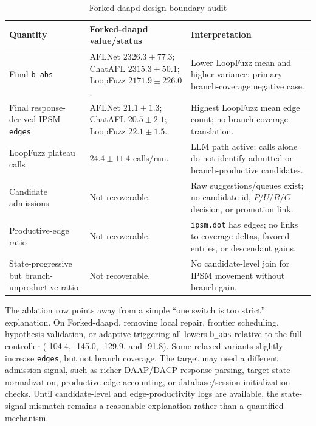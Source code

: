 \documentclass[final,5p,times,number]{elsarticle}
\begin{document}
\begin{table}[!t]
\centering
\caption{Forked-daapd design-boundary audit}
\label{tab:forked_design_boundary}
{\scriptsize
\setlength{\tabcolsep}{3.2pt}
\renewcommand{\arraystretch}{0.95}
\begin{tabularx}{\textwidth}{>{\raggedright\arraybackslash}p{}
                              >{\raggedright\arraybackslash}p{}
                              X}
\toprule
\textbf{Quantity} & \textbf{Forked-daapd value/status} & \textbf{Interpretation} \\
\midrule
Final \texttt{b\_abs} &
AFLNet $2326.3{\pm}77.3$; ChatAFL $2315.3{\pm}50.1$; LoopFuzz $2171.9{\pm}226.0$. &
Lower LoopFuzz mean and higher variance; primary branch-coverage negative case. \\
\midrule
Final response-derived IPSM \texttt{edges} &
AFLNet $21.1{\pm}1.3$; ChatAFL $20.5{\pm}2.1$; LoopFuzz $22.1{\pm}1.5$. &
Highest LoopFuzz mean edge count; no branch-coverage translation. \\
\midrule
LoopFuzz plateau calls &
$24.4{\pm}11.4$ calls/run. &
LLM path active; calls alone do not identify admitted or branch-productive candidates. \\
\midrule
Candidate admissions &
Not recoverable. &
Raw suggestions/queues exist; no candidate id, $P/U/R/G$ decision, or promotion link. \\
\midrule
Productive-edge ratio &
Not recoverable. &
\texttt{ipsm.dot} has edges; no links to coverage deltas, favored entries, or descendant gains. \\
\midrule
State-progressive but branch-unproductive ratio &
Not recoverable. &
No candidate-level join for IPSM movement without branch gain. \\
\bottomrule
\end{tabularx}
}
\end{table}

The ablation row points away from a simple ``one switch is too strict'' explanation. On Forked-daapd, removing local repair, frontier scheduling, hypothesis validation, or adaptive triggering all lowers \texttt{b\_abs} relative to the full controller (-104.4, -145.0, -129.9, and -91.8). Some relaxed variants slightly increase \texttt{edges}, but not branch coverage. The target may need a different admission signal, such as richer DAAP/DACP response parsing, target-state normalization, productive-edge accounting, or database/session initialization checks. Until candidate-level and edge-productivity logs are available, the state-signal mismatch remains a reasonable explanation rather than a quantified mechanism.
\end{document}
